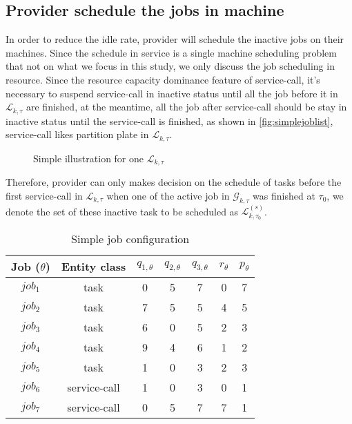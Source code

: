 

\subsection{Provider schedule the jobs in machine} %
\label{sub:schedule_the_jobs_in_machine}
In order to reduce the idle rate, provider will schedule the inactive jobs on their machines. Since the schedule in service is a single machine scheduling problem that not on  what we focus in this study, we only discuss the job scheduling in resource. Since the  resource capacity dominance feature of service-call, it's necessary to suspend service-call in inactive status until all the job before it in $\mathcal{L}_{k,\tau}$ are finished, at the meantime, all the job after service-call should be stay in inactive status until the service-call is finished, as shown in \autoref{fig:simplejoblist}, service-call likes partition plate in $\mathcal{L}_{k,\tau}$.
\begin{figure}[htbp]
	\centering
    \large
	\resizebox{.7\textwidth}{!}{}
	\caption{Simple illustration for one $\mathcal{L}_{k,\tau}$}
	\label{fig:simplejoblist}
\end{figure}
Therefore, provider can only makes decision on the schedule of tasks before the first service-call in $\mathcal{L}_{k,\tau}$ when one of the active job in $\mathcal{G}_{k,\tau}$ was finished at $\tau_0$, we denote the set of these inactive task to be scheduled as $\mathcal{L}^{(s)}_{k,\tau_0}$.

\begin{table}[htbp]
  \centering
  \scriptsize
  \caption{Simple job configuration}
    \begin{tabular}{ccccccc}
    \toprule
    Job ($\theta$) & Entity class& $q_{1,\theta}$ & $q_{2,\theta}$ & $q_{3,\theta}$ & $r_\theta$ & $p_\theta$ \\
    \midrule
    $job_1$ & task& 0     & 5     & 7     & 0     & 7 \\
    $job_2$ & task& 7     & 5     & 5     & 4     & 5 \\
    $job_3$ & task& 6     & 0     & 5     & 2     & 3 \\
    $job_4$ & task& 9	 & 4  & 6 & 1 &2 \\
    $job_5$ & task& 1 & 0 & 3 & 2 & 3\\
    $job_6$ & service-call& 1     & 0     & 3    & 0     & 1 \\
    $job_7$ & service-call& 0     & 5     & 7     & 7     & 1 \\
    \bottomrule
    \end{tabular}%
  \label{tab:simplejobconfiguration}%
\end{table}%

